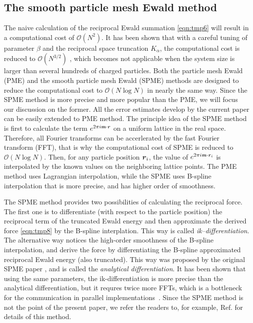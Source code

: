 \documentclass[aps,pre,preprint]{revtex4}
\renewcommand{\v}[1]{\textbf{\textit{#1}}}
\begin{document}
\subsection{The smooth particle mesh Ewald method}

The naive calculation of the reciprocal Ewald summation
\eqref{eqn:tmp6} will result in a computational cost of $\mathcal
O(N^2)$. It has been shown that with a careful tuning of parameter
$\beta$ and the reciprocal space truncation $K_\alpha$, the
computational cost is reduced to $\mathcal O(N^{3/2})$
\cite{perram1988asc}, which becomes not applicable when the system
size is larger than several hundreds of charged particles. Both the
particle mesh Ewald (PME) \cite{darden1993pme} and the smooth particle
mesh Ewald (SPME) \cite{essmann1995spm} methods are designed to reduce
the computational cost to $\mathcal O(N\log N)$ in nearly the same
way.  Since the SPME method is more precise \cite{deserno1998mue1} and
more popular than the PME, we will focus our discussion on the
former. All the error estimates develop by the current paper can be
easily extended to PME method.  The principle idea of the SPME method
is first to calculate the term $e^{2\pi i\v m\cdot\v r}$ on a uniform
lattice in the real space.  Therefore, all Fourier transforms can be
accerlerated by the fast Fourier transform (FFT), that is why the
computational cost of SPME is reduced to $\mathcal O(N\log N)$. Then,
for any particle position $\v r_i$, the value of $e^{2\pi i\v m\cdot\v
  r_i}$ is interpolated by the known values on the neighboring lattice
points.  The PME method uses Lagrangian interpolation, while the SPME
uses B-spline interpolation that is more precise, and has higher order
of smoothness.

The SPME method provides two possibilities of calculating the
reciprocal force. The first one is to differentiate (with respect to
the particle position) the reciprocal term of the truncated Ewald
energy and then approximate the derived force \eqref{eqn:tmp8} by the
B-spline interplation. This way is called
\emph{ik--differentiation}. The alternative way notices the high-order
smoothness of the B-spline interpolation, and derive the force by
differentiating the B-spline approximated reciprocal Ewald energy
(also truncated). This way was proposed by the original SPME paper
\cite{essmann1995spm}, and is called the \emph{analytical
  differentiation}.  It has been shown that using the same parameters,
the ik-differentiation is more precise than the analytical
differentiation, but it requres twice more FFTs, which is a bottleneck
for the communication in parallel
implementations~\cite{wang2010optimizing}. Since the SPME method is
not the point of the present paper, we refer the readers to, for
example, Ref. \cite{essmann1995spm, deserno1998mue1,
  wang2010optimizing} for details of this method.
\end{document}
